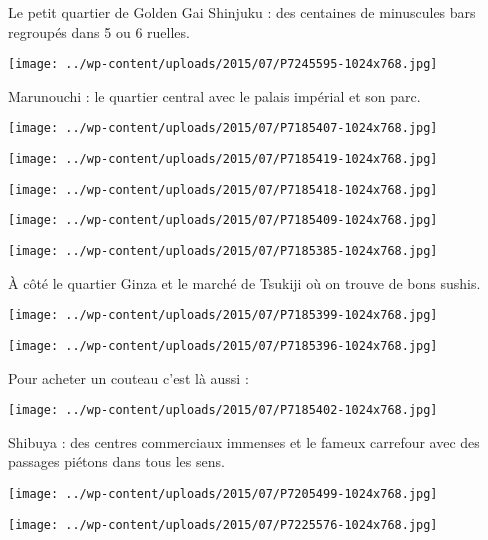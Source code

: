 Le petit quartier de Golden Gai Shinjuku : des centaines de minuscules bars regroupés dans 5 ou 6 ruelles. 
\begin{center} \texttt{[image: ../wp-content/uploads/2015/07/P7245595-1024x768.jpg]} \end{center}

\pagebreak
 Marunouchi : le quartier central avec le palais impérial et son parc. 
\begin{center} \texttt{[image: ../wp-content/uploads/2015/07/P7185407-1024x768.jpg]} \end{center}
\begin{center} \texttt{[image: ../wp-content/uploads/2015/07/P7185419-1024x768.jpg]} \end{center}
\begin{center} \texttt{[image: ../wp-content/uploads/2015/07/P7185418-1024x768.jpg]} \end{center}
\begin{center} \texttt{[image: ../wp-content/uploads/2015/07/P7185409-1024x768.jpg]} \end{center}
\begin{center} \texttt{[image: ../wp-content/uploads/2015/07/P7185385-1024x768.jpg]} \end{center}

 \`A côté le quartier Ginza et le marché de Tsukiji où on trouve de bons sushis. 
\begin{center} \texttt{[image: ../wp-content/uploads/2015/07/P7185399-1024x768.jpg]} \end{center}
\begin{center} \texttt{[image: ../wp-content/uploads/2015/07/P7185396-1024x768.jpg]} \end{center}

 Pour acheter un couteau c'est là aussi :
\begin{center} \texttt{[image: ../wp-content/uploads/2015/07/P7185402-1024x768.jpg]} \end{center}

\pagebreak
 Shibuya : des centres commerciaux immenses et le fameux carrefour avec des passages piétons dans tous les sens. 
\begin{center} \texttt{[image: ../wp-content/uploads/2015/07/P7205499-1024x768.jpg]} \end{center}
\begin{center} \texttt{[image: ../wp-content/uploads/2015/07/P7225576-1024x768.jpg]} \end{center}

